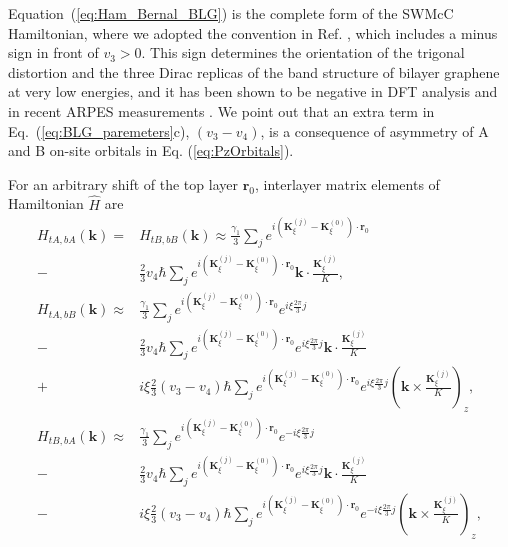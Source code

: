 \documentclass[showpacs,aps,prb,reprint,twocolumn]{revtex4-1}
\begin{document}
Equation~(\ref{eq:Ham_Bernal_BLG}) is the complete form of the SWMcC Hamiltonian, where we adopted the convention in Ref. \cite{Jeil_2014}, which includes a minus sign in front of $v_3>0$. This sign determines the orientation of the trigonal distortion and the three Dirac replicas of the band structure of bilayer graphene at very low energies, and it has been shown to be negative in DFT analysis \cite{Jeil_2014} and in recent ARPES measurements \cite{Joucken_2020}. We point out that an extra term in Eq.~(\ref{eq:BLG_paremeters}c), $(v_3-v_4)$, is a consequence of asymmetry of A and B on-site orbitals in Eq. (\ref{eq:PzOrbitals}).

For an arbitrary shift of the top layer $\boldsymbol{r}_0$, interlayer matrix elements of Hamiltonian $\hat{H}$ are
\begin{align}\label{eq:H_r0}
H_{tA,bA}(\boldsymbol{k})=&
H_{tB,bB}(\boldsymbol{k})\approx
\frac{\gamma_1}{3}
\sum_{j}
e^{i(\boldsymbol{K}_\xi^{(j)}-\boldsymbol{K}_\xi^{(0)})\cdot\boldsymbol{r}_0}\\
-&\frac{2}{3}
v_4\hbar
\sum_{j}
e^{i(\boldsymbol{K}_\xi^{(j)}-\boldsymbol{K}_\xi^{(0)})\cdot\boldsymbol{r}_0}
\boldsymbol{k}\cdot
\frac{\boldsymbol{K}_\xi^{(j)}}{K},\nonumber\\
H_{tA,bB}(\boldsymbol{k}) 
\approx&
\frac{\gamma_1}{3}
\sum_{j}
e^{i(\boldsymbol{K}_\xi^{(j)}-\boldsymbol{K}_\xi^{(0)})\cdot\boldsymbol{r}_0}
e^{i\xi\frac{2\pi}{3}j}\nonumber\\
-&\frac{2}{3}
v_4\hbar
\sum_{j}
e^{i(\boldsymbol{K}_\xi^{(j)}-\boldsymbol{K}_\xi^{(0)})\cdot\boldsymbol{r}_0}
e^{i\xi\frac{2\pi}{3}j}
\boldsymbol{k}\cdot
\frac{\boldsymbol{K}_\xi^{(j)}}{K}
\nonumber\\
+&i\xi\frac{2}{3}(v_3-v_4)\hbar
\sum_{j}
e^{i(\boldsymbol{K}_\xi^{(j)}-\boldsymbol{K}_\xi^{(0)})\cdot\boldsymbol{r}_0}
e^{i\xi\frac{2\pi}{3}j}
\left(
\boldsymbol{k}\times
\frac{\boldsymbol{K}_\xi^{(j)}}{K}
\right)_z,\nonumber
\\
H_{tB,bA}(\boldsymbol{k}) 
\approx&
\frac{\gamma_1}{3}
\sum_{j}
e^{i(\boldsymbol{K}_\xi^{(j)}-\boldsymbol{K}_\xi^{(0)})\cdot\boldsymbol{r}_0}
e^{-i\xi\frac{2\pi}{3}j}\nonumber\\
-&\frac{2}{3}
v_4\hbar
\sum_{j}
e^{i(\boldsymbol{K}_\xi^{(j)}-\boldsymbol{K}_\xi^{(0)})\cdot\boldsymbol{r}_0}
e^{i\xi\frac{2\pi}{3}j}
\boldsymbol{k}\cdot
\frac{\boldsymbol{K}_\xi^{(j)}}{K}
\nonumber\\
-&i\xi\frac{2}{3}(v_3-v_4)\hbar
\sum_{j}
e^{i(\boldsymbol{K}_\xi^{(j)}-\boldsymbol{K}_\xi^{(0)})\cdot\boldsymbol{r}_0}
e^{-i\xi\frac{2\pi}{3}j}
\left(
\boldsymbol{k}\times
\frac{\boldsymbol{K}_\xi^{(j)}}{K}
\right)_z,\nonumber
\end{align}
\end{document}
